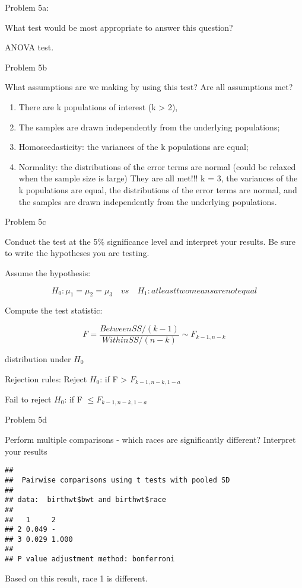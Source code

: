 \documentclass[
]{article}
\newenvironment{Shaded}{\begin{snugshade}}{\end{snugshade}}
\newcommand{\AttributeTok}[1]{\textcolor[rgb]{0.13,0.29,0.53}{#1}}
\newcommand{\FunctionTok}[1]{\textcolor[rgb]{0.13,0.29,0.53}{\textbf{#1}}}
\newcommand{\NormalTok}[1]{#1}
\newcommand{\SpecialCharTok}[1]{\textcolor[rgb]{0.81,0.36,0.00}{\textbf{#1}}}
\newcommand{\StringTok}[1]{\textcolor[rgb]{0.31,0.60,0.02}{#1}}
\providecommand{\tightlist}{%
  \setlength{\itemsep}{0pt}\setlength{\parskip}{0pt}}
\begin{document}
Problem 5a:

What test would be most appropriate to answer this question?

ANOVA test.

Problem 5b

What assumptions are we making by using this test? Are all assumptions
met?

\begin{enumerate}
\def\labelenumi{\arabic{enumi}.}
\tightlist
\item
  There are k populations of interest (k \textgreater{} 2),
\item
  The samples are drawn independently from the underlying populations;
\item
  Homoscedasticity: the variances of the k populations are equal;
\item
  Normality: the distributions of the error terms are normal (could be
  relaxed when the sample size is large) They are all met!!! k = 3, the
  variances of the k populations are equal, the distributions of the
  error terms are normal, and the samples are drawn independently from
  the underlying populations.
\end{enumerate}

Problem 5c

Conduct the test at the 5\% significance level and interpret your
results. Be sure to write the hypotheses you are testing.

Assume the hypothesis:

\[H_0 : \mu_1 = \mu_2 = \mu_3 \quad vs \quad H_1 : at least two means are not equal\]

Compute the test statistic:

\[F = {\frac{BetweenSS/(k-1)}{WithinSS/(n-k)}}\sim F_{k-1,n-k}\]

distribution under \(H_0\)

Rejection rules: Reject \(H_0\): if F \textgreater{} \(F_{k-1,n-k,1-a}\)

Fail to reject \(H_0\): if F \(\leqslant F_{k-1,n-k,1-a}\)

Problem 5d

Perform multiple comparisons - which races are significantly different?
Interpret your results

\begin{Shaded}
\end{Shaded}

\begin{verbatim}
## 
##  Pairwise comparisons using t tests with pooled SD 
## 
## data:  birthwt$bwt and birthwt$race 
## 
##   1     2    
## 2 0.049 -    
## 3 0.029 1.000
## 
## P value adjustment method: bonferroni
\end{verbatim}

Based on this result, race 1 is different.
\end{document}
